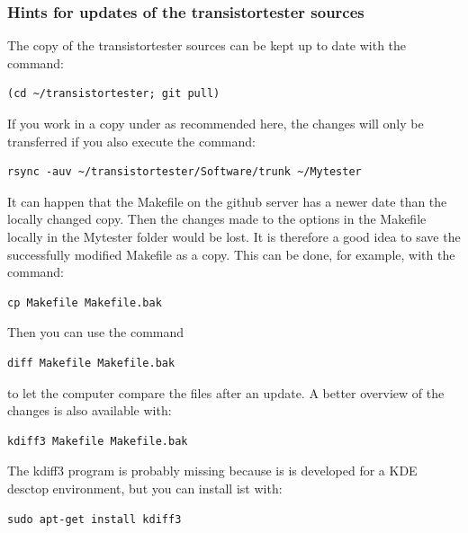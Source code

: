 \subsubsection{Hints for updates of the transistortester sources}
The copy of the transistortester sources can be kept up to date with the command:
\begin{large} \vspace{-0.4em} \begin{verbatim}
(cd ~/transistortester; git pull)
\end{verbatim} \end{large}
If you work in a copy under  as recommended here,
the changes will only be transferred if you also execute the command:
\begin{large} \vspace{-0.4em} \begin{verbatim}
rsync -auv ~/transistortester/Software/trunk ~/Mytester
\end{verbatim} \end{large}
It can happen that the Makefile on the github server has a newer date than
the locally changed copy.
Then the changes made to the options in the Makefile locally in the Mytester folder would be lost.
It is therefore a good idea to save the successfully modified Makefile as a copy.
This can be done, for example, with the command:
\begin{large} \vspace{-0.4em} \begin{verbatim}
cp Makefile Makefile.bak
\end{verbatim} \end{large}
Then you can use the command
\begin{large} \vspace{-0.4em} \begin{verbatim}
diff Makefile Makefile.bak
\end{verbatim} \end{large}
to let the computer compare the files after an update.
A better overview of the changes is also available with:
\begin{large} \vspace{-0.4em} \begin{verbatim}
kdiff3 Makefile Makefile.bak
\end{verbatim} \end{large}
The kdiff3 program is probably missing because is is developed for a
KDE desctop environment, but you can install ist with:
\begin{large} \vspace{-0.4em} \begin{verbatim}
sudo apt-get install kdiff3
\end{verbatim} \end{large}

